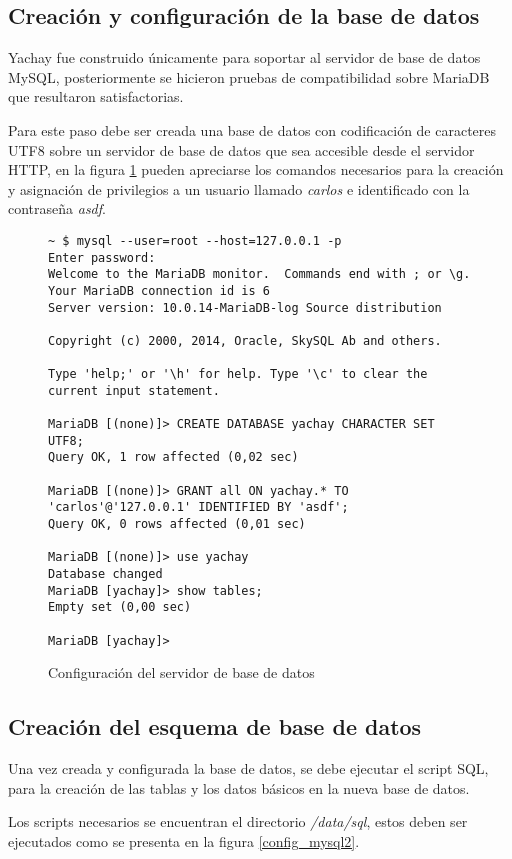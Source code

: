 \subsection{Creación y configuración de la base de datos}
Yachay fue construido únicamente para soportar al servidor de base de datos
MySQL, posteriormente se hicieron pruebas de compatibilidad sobre MariaDB que
resultaron satisfactorias.

Para este paso debe ser creada una base de datos con codificación de caracteres
UTF8 sobre un servidor de base de datos que sea accesible desde el servidor
HTTP, en la figura \ref{config_mysql1} pueden apreciarse los comandos necesarios
para la creación y asignación de privilegios a un usuario llamado \emph{carlos}
e identificado con la contraseña \emph{asdf}.

\begin{figure}
\begin{verbatim}
~ $ mysql --user=root --host=127.0.0.1 -p
Enter password: 
Welcome to the MariaDB monitor.  Commands end with ; or \g.
Your MariaDB connection id is 6
Server version: 10.0.14-MariaDB-log Source distribution

Copyright (c) 2000, 2014, Oracle, SkySQL Ab and others.

Type 'help;' or '\h' for help. Type '\c' to clear the current input statement.

MariaDB [(none)]> CREATE DATABASE yachay CHARACTER SET UTF8;
Query OK, 1 row affected (0,02 sec)

MariaDB [(none)]> GRANT all ON yachay.* TO 'carlos'@'127.0.0.1' IDENTIFIED BY 'asdf';
Query OK, 0 rows affected (0,01 sec)

MariaDB [(none)]> use yachay
Database changed
MariaDB [yachay]> show tables;
Empty set (0,00 sec)

MariaDB [yachay]> 
\end{verbatim}
\caption{Configuración del servidor de base de datos}
\label{config_mysql1}
\end{figure}

\subsection{Creación del esquema de base de datos}
Una vez creada y configurada la base de datos, se debe ejecutar el script SQL,
para la creación de las tablas y los datos básicos en la nueva base de datos.

Los scripts necesarios se encuentran el directorio \emph{/data/sql}, estos deben
ser ejecutados como se presenta en la figura \ref{config_mysql2}.

